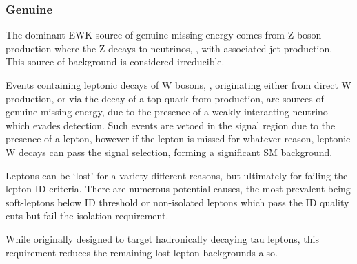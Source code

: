 \subsubsection{Genuine \met}
The dominant EWK source of genuine missing energy comes from Z-boson 
production where the Z decays
to neutrinos, \zinv, with associated jet production. This source of background
is considered irreducible.

Events containing leptonic decays of W bosons, \wlnu, originating either
from direct W production, or via the decay of a top quark from \ttbar 
production, are sources of genuine 
missing energy, due to the presence of a weakly interacting neutrino which
evades detection. Such events are vetoed in the signal
region due to the presence of a 
lepton, however if the lepton is missed for whatever reason, leptonic W decays 
can pass the signal selection, forming a significant SM background.


Leptons can be `lost' for a variety different reasons, but ultimately for failing
the lepton ID criteria. There are numerous potential causes, the 
most prevalent being soft-leptons below ID threshold or non-isolated leptons 
which pass the ID quality cuts but fail the isolation requirement.



While originally designed to target hadronically decaying tau leptons, 
this requirement reduces the remaining lost-lepton backgrounds also.

